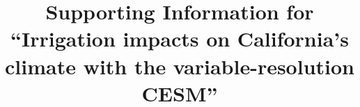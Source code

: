 \documentclass[draft,ms]{agutexSI}
\begin{document}
%
%



\title{Supporting Information for ``Irrigation impacts on California's climate with the variable-resolution CESM''}

%
%

%
\end{document}
